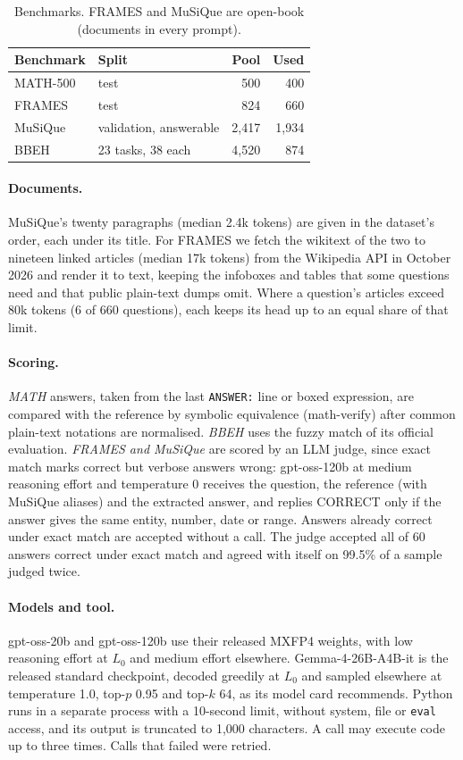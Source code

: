\begin{table}[t]
\centering
\footnotesize
\setlength{\tabcolsep}{4pt}
\begin{tabular}{@{}llrr@{}}
\toprule
Benchmark & Split & Pool & Used \\
\midrule
MATH-500 & test & 500 & 400 \\
FRAMES & test & 824 & 660 \\
MuSiQue & validation, answerable & 2{,}417 & 1{,}934 \\
BBEH & 23 tasks, 38 each & 4{,}520 & 874 \\
\bottomrule
\end{tabular}
\caption{Benchmarks. FRAMES and MuSiQue are open-book (documents in every prompt).}
\label{tab:datasets}
\end{table}

\paragraph{Documents.} MuSiQue's twenty paragraphs (median 2.4k tokens) are given in the dataset's order,
each under its title. For FRAMES we fetch the wikitext of the two to nineteen linked articles (median 17k
tokens) from the Wikipedia API in October 2026 and render it to text, keeping the infoboxes and tables that
some questions need and that public plain-text dumps omit. Where a question's articles exceed 80k tokens (6
of 660 questions), each keeps its head up to an equal share of that limit.

\paragraph{Scoring.} \emph{MATH} answers, taken from the last \texttt{ANSWER:} line or boxed expression, are
compared with the reference by symbolic equivalence (math-verify) after common plain-text notations are
normalised. \emph{BBEH} uses the fuzzy match of its official evaluation. \emph{FRAMES and MuSiQue} are scored
by an LLM judge, since exact match marks correct but verbose answers wrong: gpt-oss-120b at medium reasoning
effort and temperature 0 receives the question, the reference (with MuSiQue aliases) and the extracted answer,
and replies CORRECT only if the answer gives the same entity, number, date or range. Answers already correct
under exact match are accepted without a call. The judge accepted all of 60 answers correct under exact match
and agreed with itself on 99.5\% of a sample judged twice.

\paragraph{Models and tool.} gpt-oss-20b and gpt-oss-120b use their released MXFP4 weights, with low
reasoning effort at $L_0$ and medium effort elsewhere. Gemma-4-26B-A4B-it is the released standard
checkpoint, decoded greedily at $L_0$ and sampled elsewhere at temperature 1.0, top-$p$ 0.95 and top-$k$ 64,
as its model card recommends. Python runs in a separate process with a 10-second limit, without system,
file or \texttt{eval} access, and its output is truncated to 1{,}000 characters. A call may execute code up
to three times. Calls that failed were retried.

